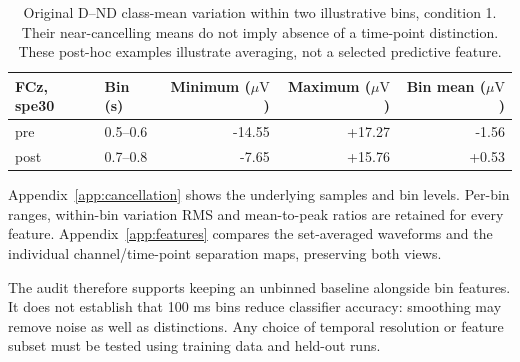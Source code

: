 \documentclass[11pt,a4paper]{article}
\newcommand{\uv}{\ensuremath{\mu\mathrm{V}}}
\begin{document}
\begin{table}[H]\centering
\begin{tabular}{@{}llrrr@{}}\toprule
FCz, spe30 & Bin (s) & Minimum (\uv) & Maximum (\uv) & Bin mean (\uv)\\\midrule
pre & 0.5--0.6 & -14.55 & +17.27 & -1.56 \\
post & 0.7--0.8 & -7.65 & +15.76 & +0.53 \\
\bottomrule\end{tabular}
\caption{Original D--ND class-mean variation within two illustrative bins, condition 1. Their near-cancelling means do not imply absence of a time-point distinction. These post-hoc examples illustrate averaging, not a selected predictive feature.}\label{tab:cancellation}
\end{table}
Appendix~\ref{app:cancellation} shows the underlying samples and bin levels. Per-bin ranges, within-bin variation RMS and mean-to-peak ratios are retained for every feature. Appendix~\ref{app:features} compares the set-averaged waveforms and the individual channel/time-point separation maps, preserving both views.

The audit therefore supports keeping an unbinned baseline alongside bin features. It does not establish that 100 ms bins reduce classifier accuracy: smoothing may remove noise as well as distinctions. Any choice of temporal resolution or feature subset must be tested using training data and held-out runs.
\clearpage
\end{document}
